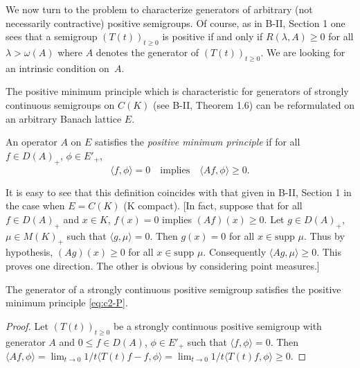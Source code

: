 We now turn to the problem to characterize generators of arbitrary (not necessarily contractive) positive semigroups.
Of course, as in B-II, Section 1 
one sees that a semigroup $(T(t))_{t \geq 0}$ is positive if and only if $R(\lambda,A) \geq 0$ for all $\lambda > \omega(A)$ where $A$ denotes the generator of $(T(t))_{t \geq 0}$.
We are looking for an intrinsic condition on~$A$.

The positive minimum principle which is characteristic for generators of strongly continuous semigroups on $C(K)$ (see 
B-II, Theorem 1.6) can be reformulated on an arbitrary Banach lattice $E$.
\begin{definition}\label{def:c2-1.6}
An operator $A$ on $E$ satisfies the \emph{positive minimum principle} if for all $f \in D(A)_{+}$, $\phi \in E'_{+}$,
\begin{equation}\label{eq:c2-P} \tag{P}
\langle f,\phi \rangle = 0 \quad \text{implies} \quad \langle Af,\phi \rangle \geq 0  .
\end{equation}
\end{definition}
\begin{remark*}\label{rem:c2-1.6}
It is easy to see that this definition coincides with that given in B-II, Section 1 
in the case when $E = C(K)$ (K compact).
[In fact, suppose that for all $f \in D(A)_{+}$ and $x \in K$, $f(x) = 0$ implies $(Af)(x) \geq 0$.
Let $g \in D(A)_{+}$, $\mu \in M(K)_{+}$ such that $\langle g,\mu \rangle = 0$.
Then $g(x) = 0$ for all $x \in \text{supp } \mu$.
Thus by hypothesis, $(Ag)(x) \geq 0$ for all $x \in \text{supp } \mu$.
Consequently $\langle Ag,\mu \rangle \geq 0$.
This proves one direction.
The other is obvious by considering point measures.]
\end{remark*}
\begin{proposition}\label{prop:c2-1.7}
The generator of a strongly continuous positive semigroup satisfies the positive minimum principle  \eqref{eq:c2-P}.  
\end{proposition}
\begin{proof}
Let $(T(t))_{t \geq 0}$ be a strongly continuous positive semigroup with generator $A$ and $0 \leq f \in D(A)$, $\phi \in E'_{+}$ such that $\langle f,\phi \rangle = 0$.
Then $\langle Af,\phi \rangle = \lim_{t \to 0} 1/t \langle T(t)f - f, \phi \rangle = \lim_{t \to 0} 1/t \langle T(t)f, \phi \rangle \geq 0$.
\end{proof}
